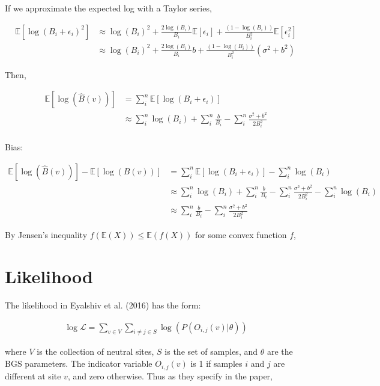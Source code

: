 \documentclass[11pt]{article}
\newcommand{\E}{\mathbb{E}}
\begin{document}
If we approximate the expected log with a Taylor series,

\begin{align}
  \E[\log(B_i + \epsilon_i)^2] &\approx \log(B_i)^2 + \frac{2 \log(B_i)}{B_i} \E[\epsilon_i] + \frac{(1-\log(B_i))}{B_i^2} \E[\epsilon_i^2]\\
                               &\approx \log(B_i)^2 + \frac{2 \log(B_i)}{B_i}b + \frac{(1-\log(B_i)) }{B_i^2}(\sigma^2 + b^2)
\end{align}

Then,

\begin{align}
  \E[\log(\hat{B}(v))] &= \sum_i^n \E[\log(B_i + \epsilon_i)]  \\
                                        &\approx \sum_i^n \log(B_i) + \sum_i^n \frac{b}{B_i} - \sum_i^n \frac{\sigma^2 + b^2}{2B_i^2}  \\
\end{align}



Bias:

\begin{align}
  \E[\log(\hat{B}(v))] - \E[\log(B(v))] &= \sum_i^n \E[\log(B_i + \epsilon_i)] - \sum_i^n \log(B_i) \\
                                        &\approx \sum_i^n \log(B_i) + \sum_i^n \frac{b}{B_i} - \sum_i^n \frac{\sigma^2 + b^2}{2B_i^2} - \sum_i^n \log(B_i) \\
                                        &\approx \sum_i^n \frac{b}{B_i} - \sum_i^n \frac{\sigma^2 + b^2}{2B_i^2} 
\end{align}

By Jensen's inequality $f(\E(X)) \le \E(f(X))$ for some convex function $f$, 

\section*{Likelihood}

The likelihood in Eyalshiv et al. (2016) has the form: 

\begin{align}
  \log\mathcal{L} = \sum_{v \in V} \sum_{i \ne j \in S} \log(P(O_{i,j}(v) | \theta))
\end{align}

where $V$ is the collection of neutral sites, $S$ is the set of samples, and
$\theta$ are the BGS parameters. The indicator variable $O_{i,j}(v)$ is 1 if
samples $i$ and $j$ are different at site $v$, and zero otherwise. Thus as they
specify in the paper, 
\end{document}
